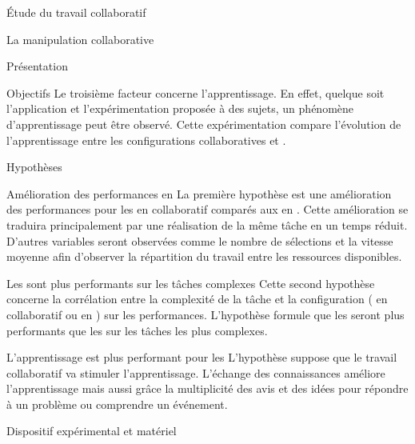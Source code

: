 \documentclass[myfrancais]{mythesis}
\begin{document}
\begin{mypart}{Étude du travail collaboratif}
\begin{mychapter}{La manipulation collaborative}
\begin{mysection}{Présentation}
\begin{mysubsection}{Objectifs}
					Le troisième facteur concerne l'apprentissage.
					En effet, quelque soit l'application et l'expérimentation proposée à des sujets, un phénomène d'apprentissage peut être observé.
					Cette expérimentation compare l'évolution de l'apprentissage entre les configurations collaboratives et .
				\end{mysubsection}
				\begin{mysubsection}{Hypothèses}
					\begin{myparagraph}{ Amélioration des performances en }
						La première hypothèse est une amélioration des performances pour les  en collaboratif comparés aux  en .
						Cette amélioration se traduira principalement par une réalisation de la même tâche en un temps réduit.
						D'autres variables seront observées comme le nombre de sélections et la vitesse moyenne afin d'observer la répartition du travail entre les ressources disponibles.
					\end{myparagraph}
					\begin{myparagraph}{ Les  sont plus performants sur les tâches complexes}
						Cette second hypothèse concerne la corrélation entre la complexité de la tâche et la configuration ( en collaboratif ou  en ) sur les performances.
						L'hypothèse formule que les  seront plus performants que les  sur les tâches les plus complexes.
					\end{myparagraph}
					\begin{myparagraph}{ L'apprentissage est plus performant pour les }
						L'hypothèse suppose que le travail collaboratif va stimuler l'apprentissage.
						L'échange des connaissances améliore l'apprentissage mais aussi grâce la multiplicité des avis et des idées pour répondre à un problème ou comprendre un événement.
					\end{myparagraph}
				\end{mysubsection}
			\end{mysection}
			\begin{mysection}{Dispositif expérimental et matériel}

\end{mysection}
\end{mychapter}
\end{mypart}
\end{document}
